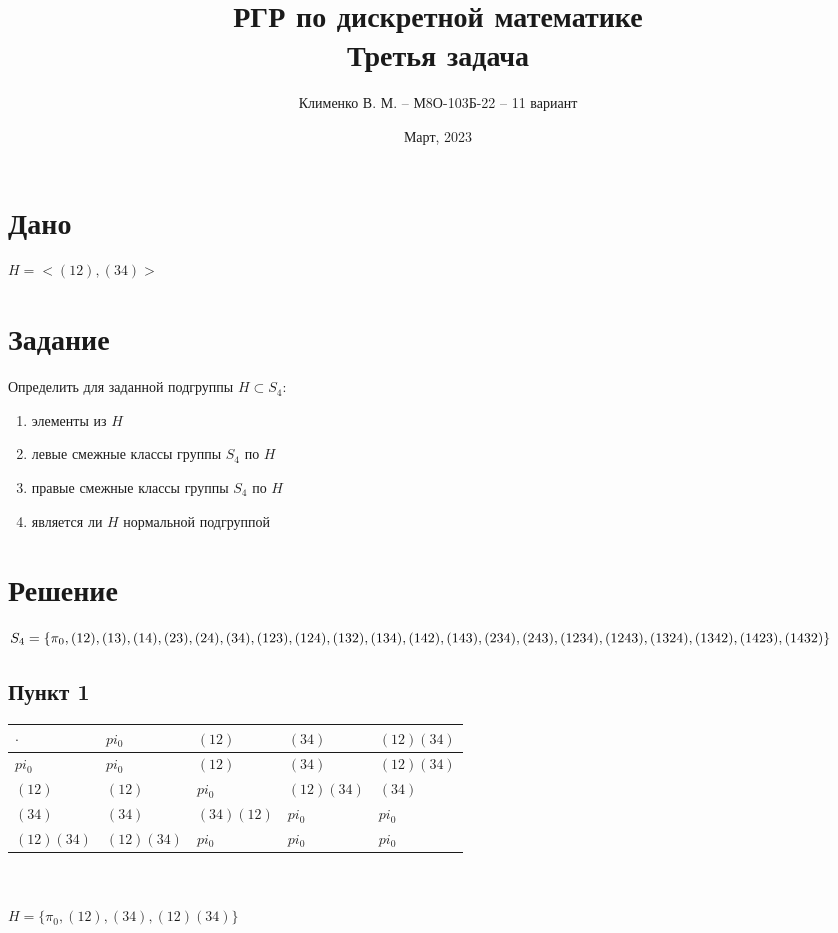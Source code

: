 \documentclass{article}
\title{РГР по дискретной математике\\Третья задача}
\author{Клименко В. М. -- М8О-103Б-22 -- 11 вариант}
\date{Март, 2023}
\begin{document}
\maketitle


\section*{Дано}
$H = <(12), (34)>$


\section*{Задание}
Определить для заданной подгруппы $H \subset S_4$:
\begin{enumerate}
    \item элементы из $H$
    \item левые смежные классы группы $S_4$ по $H$
    \item правые смежные классы группы $S_4$ по $H$
    \item является ли $H$ нормальной подгруппой
\end{enumerate}


\section*{Решение}
$S_4 = \{
\pi_0,
(12), (13), (14), (23), (24), (34),
(123), (124), (132), (134), (142), (143), (234), (243),\\
(1234), (1243), (1324), (1342), (1423), (1432)
\}$

\subsection*{Пункт 1}
\begin{tabular}{l|lll|l}
    $\cdot$      & $pi_0$     & $(12)$     & $(34)$     & $(12)(34)$ \\ 
    \midrule
      $pi_0$     & $pi_0$     & $(12)$     & $(34)$     & $(12)(34)$ \\
      $(12)$     & $(12)$     & $pi_0$     & $(12)(34)$ & $(34)$     \\
      $(34)$     & $(34)$     & $(34)(12)$ & $pi_0$     & $pi_0$     \\
    \midrule
      $(12)(34)$ & $(12)(34)$ & $pi_0$     & $pi_0$     & $pi_0$     \\
\end{tabular}
\\\\
$H = \{\pi_0, (12), (34), (12)(34)\}$
\end{document}
